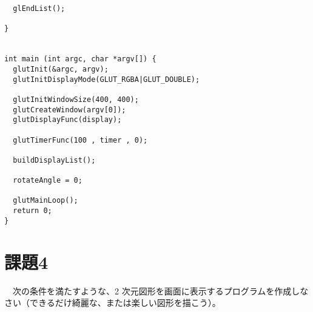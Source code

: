 \documentclass{scrartcl}
\begin{document}
\begin{verbatim}
  glEndList();

}


int main (int argc, char *argv[]) {
  glutInit(&argc, argv);
  glutInitDisplayMode(GLUT_RGBA|GLUT_DOUBLE);

  glutInitWindowSize(400, 400);
  glutCreateWindow(argv[0]);
  glutDisplayFunc(display);

  glutTimerFunc(100 , timer , 0);

  buildDisplayList();

  rotateAngle = 0;

  glutMainLoop();
  return 0;
}
\end{verbatim}

\section{課題4}
\label{sec:org7306cce}
　次の条件を満たすような、2 次元図形を画面に表示するプログラムを作成しなさい（できるだけ綺麗な、または楽しい図形を描こう）。\\
\end{document}
